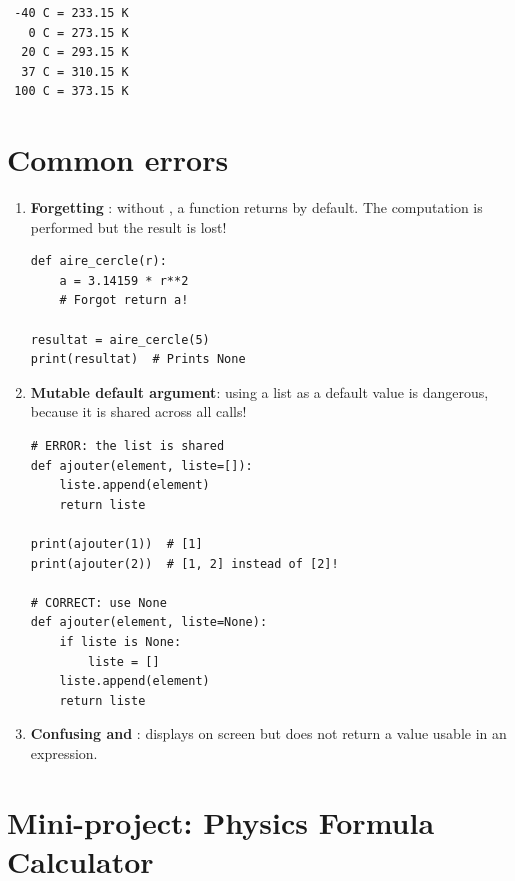 \begin{codeoutput}
\begin{verbatim}
 -40 C = 233.15 K
   0 C = 273.15 K
  20 C = 293.15 K
  37 C = 310.15 K
 100 C = 373.15 K
\end{verbatim}
\end{codeoutput}

\section{Common errors}

\begin{errmark}
\begin{enumerate}
    \item \textbf{Forgetting }: without , a function returns
     by default. The computation is performed but the result is lost!
    \begin{verbatim}
def aire_cercle(r):
    a = 3.14159 * r**2
    # Forgot return a!

resultat = aire_cercle(5)
print(resultat)  # Prints None
    \end{verbatim}

    \item \textbf{Mutable default argument}: using a list as a default
    value is dangerous, because it is shared across all calls!
    \begin{verbatim}
# ERROR: the list is shared
def ajouter(element, liste=[]):
    liste.append(element)
    return liste

print(ajouter(1))  # [1]
print(ajouter(2))  # [1, 2] instead of [2]!

# CORRECT: use None
def ajouter(element, liste=None):
    if liste is None:
        liste = []
    liste.append(element)
    return liste
    \end{verbatim}

    \item \textbf{Confusing  and }:  displays on screen
    but does not return a value usable in an expression.
\end{enumerate}
\end{errmark}

\section{Mini-project: Physics Formula Calculator}

